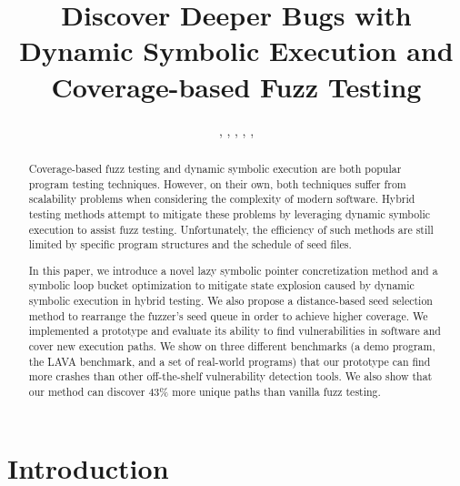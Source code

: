 \documentclass{cta-author}
\begin{document}

\title{Discover Deeper Bugs with Dynamic Symbolic Execution 
	and Coverage-based Fuzz Testing}

\author{, 
	, 
	, 
	, 
	, 
	}
%
\address{
}

\begin{abstract}
Coverage-based fuzz testing and dynamic symbolic execution are both 
popular program testing techniques. However, on their own, both techniques 
suffer from scalability problems when considering the complexity of 
modern software. Hybrid testing methods attempt to mitigate these 
problems by leveraging dynamic symbolic execution to assist fuzz 
testing. Unfortunately, the efficiency of such methods are still 
limited by specific program structures and the schedule of seed files.

In this paper, we introduce a novel lazy symbolic pointer concretization 
method and a symbolic loop bucket optimization to mitigate state explosion 
caused by dynamic symbolic execution in hybrid testing.
We also propose a distance-based seed selection method to rearrange the 
fuzzer's seed queue in order to achieve higher coverage. We implemented 
a prototype and evaluate its ability to find vulnerabilities in software 
and cover new execution paths. We show on three different benchmarks (a 
demo program, the LAVA benchmark, and a set of real-world programs) that 
our prototype can find more crashes than other off-the-shelf vulnerability 
detection tools. We also show that our method can discover 43\% more 
unique paths than vanilla fuzz testing.
\end{abstract}

\maketitle

\section{Introduction} \label{sec:introduction}

\end{document}

